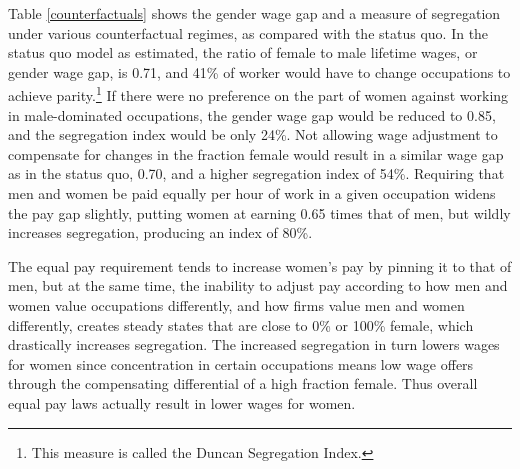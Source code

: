 \documentclass[12pt]{article}
\begin{document}
Table \ref{counterfactuals} shows the gender wage gap and a measure of segregation under various counterfactual regimes, as compared with the status quo. In the status quo model as estimated, the ratio of female to male lifetime wages, or gender wage gap, is 0.71, and 41\% of worker would have to change occupations to achieve parity.\footnote{This measure is called the Duncan Segregation Index.} If there were no preference on the part of women against working in male-dominated occupations, the gender wage gap would be reduced to 0.85, and the segregation index would be only 24\%. Not allowing wage adjustment to compensate for changes in the fraction female would result in a similar wage gap as in the status quo, 0.70, and a higher segregation index of 54\%. Requiring that men and women be paid equally per hour of work in a given occupation widens the pay gap slightly, putting women at earning 0.65 times that of men, but wildly increases segregation, producing an index of 80\%. 

The equal pay requirement tends to increase women's pay by pinning it to that of men, but at the same time, the inability to adjust pay according to how men and women value occupations differently, and how firms value men and women differently, creates steady states that are close to 0\% or 100\% female, which drastically increases segregation. The increased segregation in turn lowers wages for women since concentration in certain occupations means low wage offers through the compensating differential of a high fraction female. Thus overall equal pay laws actually result in lower wages for women.











\end{document}
